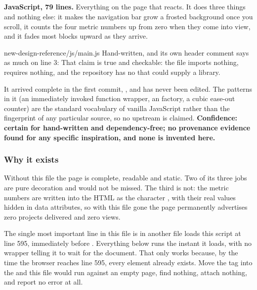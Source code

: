 \subsection{}

\textbf{JavaScript, 79 lines.} Everything on the page that reacts. It does three
things and nothing else: it makes the navigation bar grow a frosted background
once you scroll, it counts the four metric numbers up from zero when they come
into view, and it fades most blocks upward as they arrive.

\begin{provenance}{new-design-reference/js/main.js}
Hand-written, and its own header comment says as much on line 3:  That claim is true and checkable: the file imports
nothing, requires nothing, and the repository has no  that
could supply a library.

It arrived complete in the first commit, , and has never been
edited. The patterns in it (an immediately invoked function wrapper, an
 factory, a cubic ease-out counter) are the standard
vocabulary of vanilla JavaScript rather than the fingerprint of any particular
source, so no upstream is claimed. \textbf{Confidence: certain for hand-written
and dependency-free; no provenance evidence found for any specific inspiration,
and none is invented here.}
\end{provenance}

\subsubsection*{Why it exists}

Without this file the page is complete, readable and static. Two of its three
jobs are pure decoration and would not be missed. The third is not: the metric
numbers are written into the HTML as the character , with their real
values hidden in data attributes, so with this file gone the page permanently
advertises zero projects delivered and zero views.

\begin{keyidea}{The single most important line in this file is in another file}
 loads this script at line 595, immediately before
. Everything below runs the instant it loads, with no wrapper
telling it to wait for the document. That only works because, by the time the
browser reaches line 595, every element already exists. Move the
 tag into the  and this file would run against an
empty page, find nothing, attach nothing, and report no error at all.
\end{keyidea}

